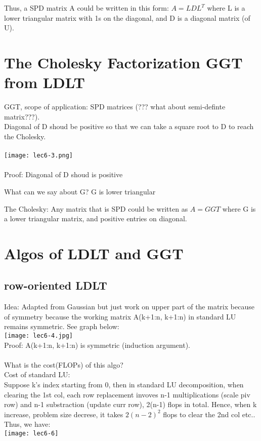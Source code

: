 \documentclass{article}
\begin{document}
\noindent
Thus, a SPD matrix A could be written in this form: $A = LDL^T$
where L is a lower triangular matrix with 1s on the diagonal, and D is a diagonal matrix (of U).\\



\pagebreak
\section{The Cholesky Factorization GGT from LDLT}

GGT, scope of application: SPD matrices (??? what about semi-definte matrix???).\\

Diagonal of D shoud be positive so that we can take a square root to D to reach the Cholesky.\\
\\
\texttt{[image: lec6-3.png]}\\
\\
\medskip
Proof: Diagonal of D shoud is positive


\noindent
What can we say about G? G is lower triangular

\noindent
The Cholesky: Any matrix that is SPD could be written as $A = GGT$ where G is a lower triangular matrix, and positive
entries on diagonal.\\

\pagebreak
\section{Algos of LDLT and GGT}
\subsection*{row-oriented LDLT}
Idea: Adapted from Gaussian but just work on upper part of the matrix because of symmetry because
the working matrix A(k+1:n, k+1:n) in standard LU remains symmetric. See graph below:\\
\texttt{[image: lec6-4.jpg]}\\


\noindent
Proof: A(k+1:n, k+1:n) is symmetric (induction argument).\\
\\
\noindent
What is the cost(FLOPs) of this algo?\\
Cost of standard LU:\\
Suppose k's index starting from 0, then in standard LU decomposition, when clearing
the 1st col, each row replacement invoves n-1 multiplications (scale piv row) and n-1 substraction (update
curr row), 2(n-1) flops in total. Hence, when k increase, problem size decrese, it takes $2(n-2)^2$ flops
to clear the 2nd col etc.. Thus, we have:\\
\texttt{[image: lec6-6]}\\
\end{document}
